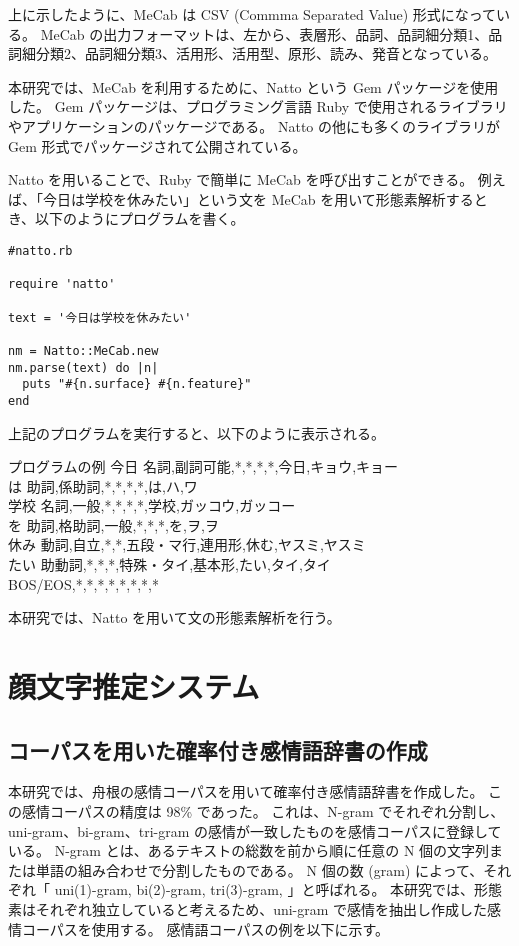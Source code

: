 \documentclass[11pt,a4j]{jsarticle}
\begin{document}
上に示したように、MeCab は CSV (Commma Separated Value) 形式になっている。
MeCab の出力フォーマットは、左から、表層形、品詞、品詞細分類1、品詞細分類2、品詞細分類3、活用形、活用型、原形、読み、発音となっている。

本研究では、MeCab を利用するために、Natto という Gem パッケージを使用した。
Gem パッケージは、プログラミング言語 Ruby で使用されるライブラリやアプリケーションのパッケージである。
Natto の他にも多くのライブラリが Gem 形式でパッケージされて公開されている。

Natto を用いることで、Ruby で簡単に MeCab を呼び出すことができる。
例えば、「今日は学校を休みたい」という文を MeCab を用いて形態素解析するとき、以下のようにプログラムを書く。

\newpage

\begin{verbatim}
#natto.rb

require 'natto'

text = '今日は学校を休みたい'

nm = Natto::MeCab.new
nm.parse(text) do |n|
  puts "#{n.surface} #{n.feature}"
end
\end{verbatim}

上記のプログラムを実行すると、以下のように表示される。

\begin{itembox}[l]{プログラムの例}
  今日  名詞,副詞可能,*,*,*,*,今日,キョウ,キョー \\
  は  助詞,係助詞,*,*,*,*,は,ハ,ワ\\ 
  学校  名詞,一般,*,*,*,*,学校,ガッコウ,ガッコー\\
  を  助詞,格助詞,一般,*,*,*,を,ヲ,ヲ\\
  休み  動詞,自立,*,*,五段・マ行,連用形,休む,ヤスミ,ヤスミ\\
  たい  助動詞,*,*,*,特殊・タイ,基本形,たい,タイ,タイ\\
 BOS/EOS,*,*,*,*,*,*,*,*\\
\end{itembox}

本研究では、Natto を用いて文の形態素解析を行う。

\section{顔文字推定システム}\label{sec:theorem}
  \subsection{コーパスを用いた確率付き感情語辞書の作成}\label{sec:tweetcorpus}
本研究では、舟根の感情コーパスを用いて確率付き感情語辞書を作成した。
この感情コーパスの精度は 98\% であった。
これは、N-gram でそれぞれ分割し、uni-gram、bi-gram、tri-gram の感情が一致したものを感情コーパスに登録している。
N-gram とは、あるテキストの総数を前から順に任意の N 個の文字列または単語の組み合わせで分割したものである。
N 個の数 (gram) によって、それぞれ「 uni(1)-gram, bi(2)-gram, tri(3)-gram, \cdots 」と呼ばれる。
本研究では、形態素はそれぞれ独立していると考えるため、uni-gram で感情を抽出し作成した感情コーパスを使用する。
感情語コーパスの例を以下に示す。
\end{document}
